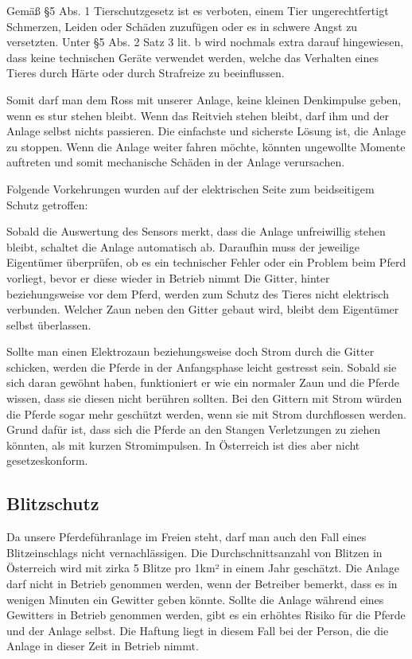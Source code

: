\documentclass[12pt]{scrreprt} %
\begin{document}
Gemäß §5 Abs. 1 Tierschutzgesetz ist es verboten, 
einem Tier ungerechtfertigt Schmerzen, Leiden oder Schäden zuzufügen oder es in schwere Angst zu versetzten. 
Unter §5 Abs. 2 Satz 3 lit. b wird nochmals extra darauf hingewiesen, dass keine technischen Geräte verwendet werden, welche das Verhalten eines Tieres durch Härte oder durch Strafreize zu beeinflussen. 

Somit darf man dem Ross mit unserer Anlage, keine kleinen Denkimpulse geben, wenn es stur stehen bleibt. Wenn das Reitvieh stehen bleibt, darf ihm und der Anlage selbst nichts passieren. Die einfachste und sicherste Lösung ist, die Anlage zu stoppen. Wenn die Anlage weiter fahren möchte, könnten ungewollte Momente auftreten und somit mechanische Schäden in der Anlage verursachen.

Folgende Vorkehrungen wurden auf der elektrischen Seite zum beidseitigem Schutz getroffen:

Sobald die Auswertung des Sensors merkt, dass die Anlage unfreiwillig stehen bleibt, schaltet die Anlage automatisch ab. Daraufhin muss der jeweilige Eigentümer überprüfen, ob es ein technischer Fehler oder ein Problem beim Pferd vorliegt, bevor er diese wieder in Betrieb nimmt
Die Gitter, hinter beziehungsweise vor dem Pferd, werden zum Schutz des Tieres nicht elektrisch verbunden.
Welcher Zaun neben den Gitter gebaut wird, bleibt dem Eigentümer selbst überlassen.

Sollte man einen Elektrozaun beziehungsweise doch Strom durch die Gitter schicken, werden die Pferde in der Anfangsphase leicht gestresst sein. Sobald sie sich daran gewöhnt haben, funktioniert er wie ein normaler Zaun und die Pferde wissen, dass sie diesen nicht berühren sollten.
Bei den Gittern mit Strom würden die Pferde sogar mehr geschützt werden, wenn sie mit Strom durchflossen werden. Grund dafür ist, dass sich die Pferde an den Stangen Verletzungen zu ziehen könnten, als mit kurzen Stromimpulsen. In Österreich ist dies aber nicht gesetzeskonform.

\subsection{Blitzschutz}
\label{sec:blitzschutz}

Da unsere Pferdeführanlage im Freien steht, darf man auch den Fall eines Blitzeinschlags nicht vernachlässigen. 
Die Durchschnittsanzahl von Blitzen in Österreich wird mit zirka 5 Blitze pro 1km² in einem Jahr geschätzt. 
Die Anlage darf nicht in Betrieb genommen werden, wenn der Betreiber bemerkt, 
dass es in wenigen Minuten ein Gewitter geben könnte.
Sollte die Anlage während eines Gewitters in Betrieb genommen werden, 
gibt es ein erhöhtes Risiko für die Pferde und der Anlage selbst.
Die Haftung liegt in diesem Fall bei der Person, die die Anlage in dieser Zeit in Betrieb nimmt.
\end{document}
